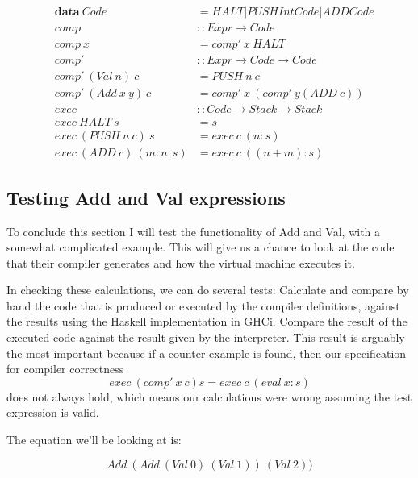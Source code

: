 \documentclass {article}
\begin{document}
\begin{eqnarray}
	&\textbf{data}\ Code &= HALT | PUSH Int Code | ADD Code \nonumber \\
	&comp &:: Expr \rightarrow Code \nonumber \\
	&comp\ x &= comp'\ x\ HALT \label{comp}\\
	&comp' &:: Expr \rightarrow Code \rightarrow Code \nonumber \\
	&comp'\ (Val\ n)\ c &= PUSH\ n\ c \label{compval}\\
	&comp'\ (Add\ x\ y)\ c 
				&= comp'\ x\ (comp'\ y (ADD\ c)) \label{compadd}\\
	&exec &:: Code  \rightarrow Stack \rightarrow Stack \nonumber \\
	&exec\ HALT\ s &= s \label{exechalt}\\
	&exec\ (PUSH\ n\ c)\ s &= exec\ c\ (n:s) \label{execpush}\\
	&exec\ (ADD\ c)\ (m:n:s) &= exec\ c\ ((n + m):s) \label{execadd}
\end{eqnarray}

\subsection{Testing Add and Val expressions}

To conclude this section I will test the functionality
of Add and Val, with a somewhat complicated
example.
This will give us a chance to look at the code that their
compiler generates and how the virtual machine executes it.

In checking these calculations, we can do several tests:
Calculate and compare by hand 
the code that is produced or executed
by the compiler definitions, 
against the results using the Haskell implementation in GHCi.
Compare the result of the executed code against the result
given by the interpreter. 
This result is arguably the most
important because if a counter example is found,
then our specification for compiler correctness 
\[ exec\ (comp'\ x\ c) s = exec\ c\ (eval\ x : s) \]
does not always hold, 
which means our calculations were wrong
assuming the test expression is valid.


The equation we'll be looking at is:

\[ Add\ (Add\ (Val\ 0)\ (Val\ 1))\ (Val\ 2)) \]
\end{document}
